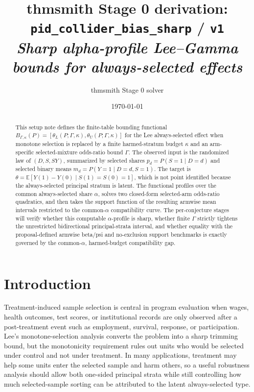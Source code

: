 \documentclass[11pt]{article}
\title{thmsmith Stage 0 derivation: \texttt{pid\_collider\_bias\_sharp} / \texttt{v1}%
  \\ \large\textit{Sharp alpha-profile Lee--Gamma bounds for always-selected effects}}
\author{thmsmith Stage 0 solver}
\date{\today}
\newcommand{\E}{\mathbb{E}}
\theoremstyle{definition}
\theoremstyle{plain}
\theoremstyle{remark}
\begin{document}
\maketitle


\providecommand{\citet}[1]{\cite{#1}}

\begin{abstract}
This setup note defines the finite-table bounding functional
\(B_{\Gamma,\kappa}(P)=[\theta_L(P;\Gamma,\kappa),\theta_U(P;\Gamma,\kappa)]\)
for the Lee always-selected effect when monotone selection is replaced by a
finite harmed-stratum budget \(\kappa\) and an arm-specific selected-mixture
odds-ratio bound \(\Gamma\).  The observed input is the randomized law of
\((D,S,SY)\), summarized by selected shares \(p_d=P(S=1\mid D=d)\) and selected
binary means \(m_d=P(Y=1\mid D=d,S=1)\).  The target is
\(\theta=\E[Y(1)-Y(0)\mid S(1)=S(0)=1]\), which is not point identified because
the always-selected principal stratum is latent.  The functional profiles over the common
always-selected share \(\alpha\), solves two closed-form selected-arm
odds-ratio quadratics, and then takes the support function of the resulting
armwise mean intervals restricted to the common-\(\alpha\) compatibility curve.
The per-conjecture stages will verify whether this computable
\(\alpha\)-profile is sharp, whether finite \(\Gamma\) strictly tightens the
unrestricted bidirectional principal-strata interval, and whether equality with
the proposal-defined armwise beta/psi and no-exclusion support benchmarks is
exactly governed by the common-\(\alpha\), harmed-budget compatibility gap.
\end{abstract}

\section{Introduction}
Treatment-induced sample selection is central in program evaluation when wages,
health outcomes, test scores, or institutional records are only observed after a
post-treatment event such as employment, survival, response, or participation.
Lee's monotone-selection analysis converts the problem into a sharp trimming
bound, but the monotonicity requirement rules out units who would be selected
under control and not under treatment.  In many applications, treatment may help
some units enter the selected sample and harm others, so a useful robustness
analysis should allow both one-sided principal strata while still controlling
how much selected-sample sorting can be attributed to the latent always-selected
type.
\end{document}
